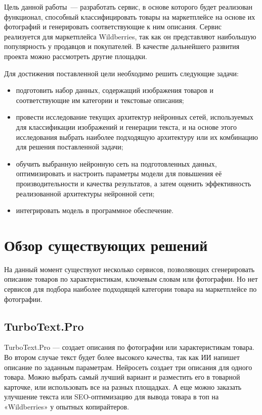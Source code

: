 \documentclass[a4paper,12pt]{extarticle}
\begin{document}
Цель данной работы — разработать сервис, в основе которого будет реализован функционал, способный классифицировать товары на маркетплейсе на основе их фотографий и генерировать соответствующие к ним описания. Сервис реализуется для маркетплейса Wildberries, так как он представляют наибольшую популярность у продавцов и покупателей. В качестве дальнейшего развития проекта можно рассмотреть другие площадки.

Для достижения поставленной цели необходимо решить следующие задачи:
\begin{itemize}
	\item подготовить набор данных, содержащий изображения товаров и соответствующие им категории и текстовые описания;
	\item провести исследование текущих архитектур нейронных сетей, используемых для классификации изображений и генерации текста, и на основе этого исследования выбрать наиболее подходящую архитектуру или их комбинацию для решения поставленной задачи;
	\item обучить выбранную нейронную сеть на подготовленных данных, оптимизировать и настроить параметры модели для повышения её производительности и качества результатов, а затем оценить эффективность реализованной архитектуры нейронной сети;
	\item интегрировать модель в программное обеспечение.
\end{itemize}

\newpage
\section{Обзор существующих решений}\label{exists}

На данный момент существуют несколько сервисов, позволяющих сгенерировать описание товаров по характеристикам, ключевым словам или фотографии. Но нет сервисов для подбора наиболее подходящей категории товара на маркетплейсе по фотографии.

\subsection{TurboText.Pro}

TurboText.Pro — создает описания по фотографии или характеристикам товара. Во втором случае текст будет более высокого качества, так как ИИ напишет описание по заданным параметрам. Нейросеть создает три описания для одного товара. Можно выбрать самый лучший вариант и разместить его в товарной карточке, или использовать все на разных площадках. А еще можно заказать улучшение текста или SEO-оптимизацию для вывода товара в топ на «Wildberries» у опытных копирайтеров.
\end{document}
